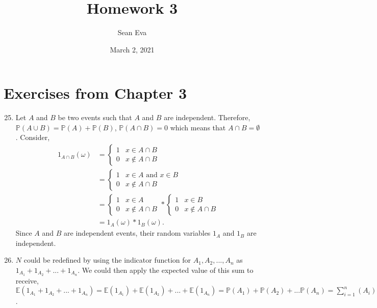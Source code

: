 \documentclass{article}
\title{Homework 3}
\author{Sean Eva}
\date{March 2, 2021}
\begin{document}
\maketitle

\section{Exercises from Chapter 3}

\begin{enumerate}
    \setcounter{enumi}{24}
    \item
    
    Let $A$ and $B$ be two events such that $A$ and $B$ are independent. Therefore, $\mathbb{P}(A\cup B) = \mathbb{P}(A)+\mathbb{P}(B)$, $\mathbb{P}(A\cap B)=0$ which means that $A\cap B = \emptyset$. Consider, 
    \begin{align*}
        1_{A\cap B}(\omega) &= 
        \begin{cases}
        1 & x\in A\cap B\\
        0 & x\notin A\cap B
        \end{cases}\\
        &=
        \begin{cases}
            1 & x\in A \text{ and } x\in B\\
            0 & x\notin A\cap B
        \end{cases}\\
        &=
        \begin{cases}
            1 & x\in A\\
            0 & x\notin A\cap B
        \end{cases}
        *
        \begin{cases}
            1 & x\in B\\
            0 & x\notin A\cap B
        \end{cases}\\
        &= 1_A(\omega)*1_B(\omega).
    \end{align*}
    Since $A$ and $B$ are independent events, their random variables $1_A$ and $1_B$ are independent.
    
    \setcounter{enumi}{41}
    \item
    
    $N$ could be redefined by using the indicator function for $A_1, A_2, ..., A_n$ as $1_{A_1}+1_{A_2}+...+1_{A_n}$. We could then apply the expected value of this sum to receive, $\mathbb{E}(1_{A_1}+1_{A_2}+...+1_{A_n})=\mathbb{E}(1_{A_1})+\mathbb{E}(1_{A_2})+...+\mathbb{E}(1_{A_n}) = \mathbb{P}(A_1)+\mathbb{P}(A_2)+...\mathbb{P}(A_n) = \sum_{i=1}^n(A_i)$.
    
\end{enumerate}
\end{document}
